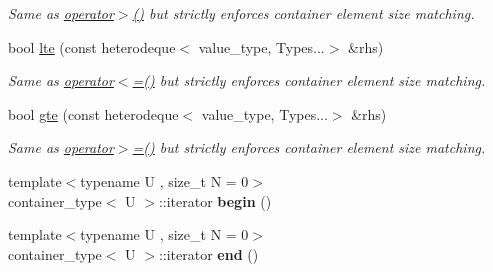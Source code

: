 \begin{DoxyCompactItemize}
\begin{DoxyCompactList}\small\item\em Same as \hyperlink{classheterogeneous_1_1heterodeque_3_01_t_00_01_types_8_8_8_4_ade3d8283efa87cffb0e1badf6bca89dc}{operator$>$()} but strictly enforces container element size matching. \end{DoxyCompactList}\item 
\hypertarget{classheterogeneous_1_1heterodeque_3_01_t_00_01_types_8_8_8_4_a7f25ce359e7c0afd83584104e0833849}{}bool \hyperlink{classheterogeneous_1_1heterodeque_3_01_t_00_01_types_8_8_8_4_a7f25ce359e7c0afd83584104e0833849}{lte} (const heterodeque$<$ value\+\_\+type, Types...$>$ \&rhs)\label{classheterogeneous_1_1heterodeque_3_01_t_00_01_types_8_8_8_4_a7f25ce359e7c0afd83584104e0833849}

\begin{DoxyCompactList}\small\item\em Same as \hyperlink{classheterogeneous_1_1heterodeque_3_01_t_00_01_types_8_8_8_4_a01b5ad6d5bba6eb0b96d28b8c7b6616e}{operator$<$=()} but strictly enforces container element size matching. \end{DoxyCompactList}\item 
\hypertarget{classheterogeneous_1_1heterodeque_3_01_t_00_01_types_8_8_8_4_a8efacb60bc053a9cb68a07a34b9dbeec}{}bool \hyperlink{classheterogeneous_1_1heterodeque_3_01_t_00_01_types_8_8_8_4_a8efacb60bc053a9cb68a07a34b9dbeec}{gte} (const heterodeque$<$ value\+\_\+type, Types...$>$ \&rhs)\label{classheterogeneous_1_1heterodeque_3_01_t_00_01_types_8_8_8_4_a8efacb60bc053a9cb68a07a34b9dbeec}

\begin{DoxyCompactList}\small\item\em Same as \hyperlink{classheterogeneous_1_1heterodeque_3_01_t_00_01_types_8_8_8_4_a1fbaa29bfd22120d6e28a119496874bb}{operator$>$=()} but strictly enforces container element size matching. \end{DoxyCompactList}\item 
\hypertarget{classheterogeneous_1_1heterodeque_3_01_t_00_01_types_8_8_8_4_ae4fc04b3ce904f0402e6520f9bf2710d}{}{\footnotesize template$<$typename U , size\+\_\+t N = 0$>$ }\\container\+\_\+type$<$ U $>$\+::iterator {\bfseries begin} ()\label{classheterogeneous_1_1heterodeque_3_01_t_00_01_types_8_8_8_4_ae4fc04b3ce904f0402e6520f9bf2710d}

\item 
\hypertarget{classheterogeneous_1_1heterodeque_3_01_t_00_01_types_8_8_8_4_a6463aeed9fba3b4e14808db5101ccabb}{}{\footnotesize template$<$typename U , size\+\_\+t N = 0$>$ }\\container\+\_\+type$<$ U $>$\+::iterator {\bfseries end} ()\label{classheterogeneous_1_1heterodeque_3_01_t_00_01_types_8_8_8_4_a6463aeed9fba3b4e14808db5101ccabb}


\end{DoxyCompactItemize}
